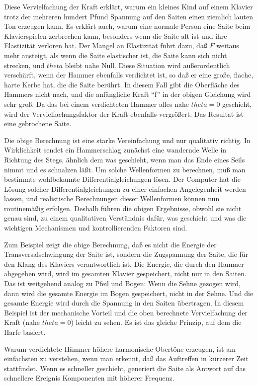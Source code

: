 Diese Vervielfachung der Kraft erklärt, warum ein kleines Kind auf einem Klavier trotz der mehreren hundert Pfund Spannung auf den Saiten einen ziemlich lauten Ton erzeugen kann.
Es erklärt auch, warum eine normale Person eine Saite beim Klavierspielen zerbrechen kann, besonders wenn die Saite alt ist und ihre Elastizität verloren hat.
Der Mangel an Elastizität führt dazu, daß $F$ weitaus mehr ansteigt, als wenn die Saite elastischer ist, die Saite kann sich nicht strecken, und $theta$ bleibt nahe Null.
Diese Situation wird außerordentlich verschärft, wenn der Hammer ebenfalls verdichtet ist, so daß er eine große, flache, harte Kerbe hat, die die Saite berührt.
In diesem Fall gibt die Oberfläche des Hammers nicht nach, und die anfängliche Kraft \enquote{f} in der obigen Gleichung wird sehr groß.
Da das bei einem verdichteten Hammer alles nahe $theta = 0$ geschieht, wird der Vervielfachungsfaktor der Kraft ebenfalls vergrößert.
Das Resultat ist eine gebrochene Saite.

Die obige Berechnung ist eine starke Vereinfachung und nur qualitativ richtig.
In Wirklichkeit sendet ein Hammerschlag zunächst eine wandernde Welle in Richtung des Stegs, ähnlich dem was geschieht, wenn man das Ende eines Seils nimmt und es schnalzen läßt.
Um solche Wellenformen zu berechnen, muß man bestimmte wohlbekannte Differentialgleichungen lösen.
Der Computer hat die Lösung solcher Differentialgleichungen zu einer einfachen Angelegenheit werden lassen, und realistische Berechnungen dieser Wellenformen können nun routinemäßig erfolgen.
Deshalb führen die obigen Ergebnisse, obwohl sie nicht genau sind, zu einem qualitativen Verständnis dafür, was geschieht und was die wichtigen Mechanismen und kontrollierenden Faktoren sind.

Zum Beispiel zeigt die obige Berechnung, daß es nicht die Energie der Transversalschwingung der Saite ist, sondern die Zugspannung der Saite, die für den Klang des Klaviers verantwortlich ist.
Die Energie, die durch den Hammer abgegeben wird, wird im gesamten Klavier gespeichert, nicht nur in den Saiten.
Das ist weitgehend analog zu Pfeil und Bogen: Wenn die Sehne gezogen wird, dann wird die gesamte Energie im Bogen gespeichert, nicht in der Sehne.
Und die gesamte Energie wird durch die Spannung in den Saiten übertragen.
In diesem Beispiel ist der mechanische Vorteil und die oben berechnete Vervielfachung der Kraft (nahe $theta = 0$) leicht zu sehen.
Es ist das gleiche Prinzip, auf dem die Harfe basiert.

Warum verdichtete Hämmer höhere harmonische Obertöne erzeugen, ist am einfachsten zu verstehen, wenn man erkennt, daß das Auftreffen in kürzerer Zeit stattfindet.
Wenn es schneller geschieht, generiert die Saite als Antwort auf das schnellere Ereignis Komponenten mit höherer Frequenz.


